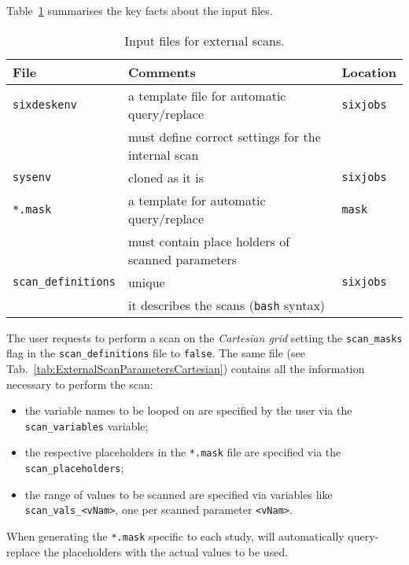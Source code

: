 Table~\ref{tab:ExternalScanInputFile} summarises the key facts about the
input files.
\begin{table}[h]
\begin{center}
    \caption{Input files for external scans.}
    \label{tab:ExternalScanInputFile}
    \begin{tabular}{|l|l|l|}
    \hline
    \rowcolor{blue!30}
    \textbf{File} & \textbf{Comments} & \textbf{Location} \\
    \hline
    \texttt{sixdeskenv} & a template file for automatic query/replace
    & \texttt{sixjobs} \\
    & must define correct settings for the internal scan & \\
    \texttt{sysenv} & cloned as it is & \texttt{sixjobs} \\
    \texttt{*.mask} & a template for automatic query/replace & \texttt{mask} \\
    & must contain place holders of scanned parameters & \\
    \texttt{scan\_definitions} & unique & \texttt{sixjobs} \\
    & it describes the scans (\texttt{bash} syntax) & \\
    \hline
    \end{tabular}
\end{center}
\end{table}

The user requests \SIXDESK{} to perform a scan on the \emph{Cartesian grid}
setting the \texttt{scan\_masks} flag in the \texttt{scan\_definitions} file
to \texttt{false}. The same file (see
Tab.~\ref{tab:ExternalScanParametersCartesian}) contains all the information
necessary to perform the scan:
\begin{itemize}
\item the variable names to be looped on are specified by the user via
  the \texttt{scan\_variables} variable;
\item the respective placeholders in the \texttt{*.mask} file are
  specified via the \texttt{scan\_placeholders};
\item the range of values to be scanned are specified via variables
  like \texttt{scan\_vals\_<vNam>}, one per scanned parameter
  \texttt{<vNam>}.
\end{itemize}

When generating the \texttt{*.mask} specific to each study,
\SIXDESK{} will automatically query-replace the placeholders with
the actual values to be used.

